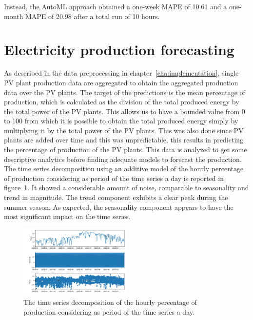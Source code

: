 Instead, the AutoML approach obtained a one-week MAPE of 10.61 and a one-month MAPE of 20.98 after a total run of 10 hours.



\section{Electricity production forecasting}
\label{sec:productionval}
\vspace{0.2 cm}

As described in the data preprocessing in chapter~\ref{cha:implementation}, single PV plant production data are aggregated to obtain the aggregated production data over the PV plants.
The target of the predictions is the mean percentage of production, which is calculated as the division of the total produced energy by the total power of the PV plants.
This allows us to have a bounded value from 0 to 100 from which it is possible to obtain the total produced energy simply by multiplying it by the total power of the PV plants.
This was also done since PV plants are added over time and this was unpredictable, this results in predicting the percentage of production of the PV plants.
This data is analyzed to get some descriptive analytics before finding adequate models to forecast the production.
The time series decomposition using an additive model of the hourly percentage of production considering as period of the time series a day is reported in figure~\ref{fig:productiondecomposition}.
It showed a considerable amount of noise, comparable to seasonality and trend in magnitude.
The trend component exhibits a clear peak during the summer season.
As expected, the seasonality component appears to have the most significant impact on the time series.

\begin{figure}[H]
\centering
\includegraphics[width=0.5\textwidth]{images/production/hourly_decomposition}
\caption{The time series decomposition of the hourly percentage of production considering as period of the time series a day.}
\label{fig:productiondecomposition}
\end{figure}

